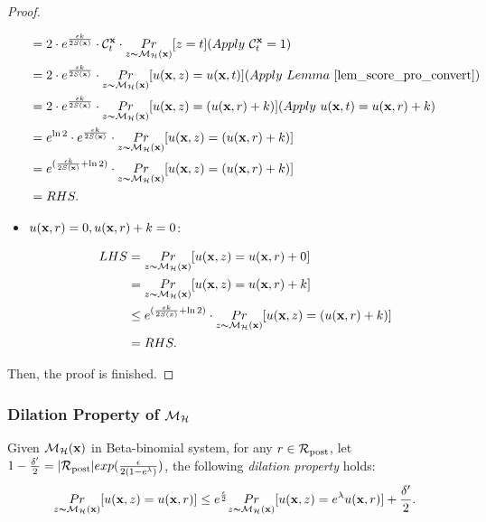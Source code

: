 \documentclass{article}
\begin{document}
\begin{proof}
\begin{itemize}
\begin{equation*}
\begin{split}
      & = 2 \cdot e^{\frac{\epsilon k}{2 S(\dataobs)}} \cdot \cardinality{\dataobs}{t} \cdot \hexpmechPr{\dataobs}{z = t} (Apply\ \cardinality{\dataobs}{t} = 1)\\
      & = 2 \cdot e^{\frac{\epsilon k}{2 S(\dataobs)}} \cdot \hexpmechPr{\dataobs}{\ux{z} = \ux{t}}       (Apply \ Lemma\ \ref{lem_score_pro_convert})\\
      & = 2 \cdot e^{\frac{\epsilon k}{2 S(\dataobs)}} \cdot \hexpmechPr{\dataobs}{\ux{z} = (\ux{r} + k)} (Apply \ \ux{t} = \ux{r} + k)\\
      & = e^{\ln 2} \cdot e^{\frac{\epsilon k}{2 S(\dataobs)}} \cdot \hexpmechPr{\dataobs}{\ux{z} = (\ux{r} + k)}\\
      & = e^{(\frac{\epsilon k}{2 S(\dataobs)} + \ln 2)} \cdot \hexpmechPr{\dataobs}{\ux{z} = (\ux{r} + k)}\\
      & = RHS.
      \end{split}
      \end{equation*} 

  \item {\boldmath $u(\textbf{x}, {r}) = 0, u(\textbf{x}, {r}) + k = 0$}: 

        \begin{equation*}
        \begin{split}
        LHS 
        & = \underset{z \thicksim \mathcal{M}_{\mathcal{H}}(\textbf{x})}{Pr}[u(\textbf{x}, {z}) = u(\textbf{x}, {r}) + 0]\\
        & = \underset{z \thicksim \mathcal{M}_{\mathcal{H}}(\textbf{x})}{Pr}[u(\textbf{x}, {z}) = u(\textbf{x}, {r}) + k]\\
        & \leq e^{(\frac{\epsilon k}{2 S(x)} + \ln 2)} \cdot \underset{z \thicksim \mathcal{M}_{\mathcal{H}}(\textbf{x})}{Pr}[u(\textbf{x}, {z}) = ( u(\textbf{x}, {r}) + k)]\\
        & = RHS.
        \end{split}
        \end{equation*} 

\end{itemize}
Then, the proof is finished.

\end{proof}



\subsubsection{Dilation Property of $\mathcal{M}_{\mathcal{H}}$}
\begin{lem}
\label{lem_dilation}
Given $\mathcal{M}_{\mathcal{H}}(\textbf{x})$ in Beta-binomial system, for any $r\in \mathcal{R}_{\textup{post}}$, let $1 - \frac{\delta'}{2} = |\mathcal{R}_{\textup{post}}|exp(\frac{\epsilon}{2 (1 - e ^ {\lambda})})$, the following \emph{dilation property} holds:
\begin{equation*}
\underset{z \thicksim \mathcal{M}_{\mathcal{H}}(\textbf{x})}{Pr}[u(\textbf{x}, {z}) = u(\textbf{x}, {r})]
\leq
e^{\frac{\epsilon}{2}} \underset{z \thicksim \mathcal{M}_{\mathcal{H}}(\textbf{x})}{Pr}[u(\textbf{x}, {z}) = e^{\lambda} u(\textbf{x}, {r})] + \frac{\delta'}{2}.
\end{equation*}
\end{lem}
\end{document}
